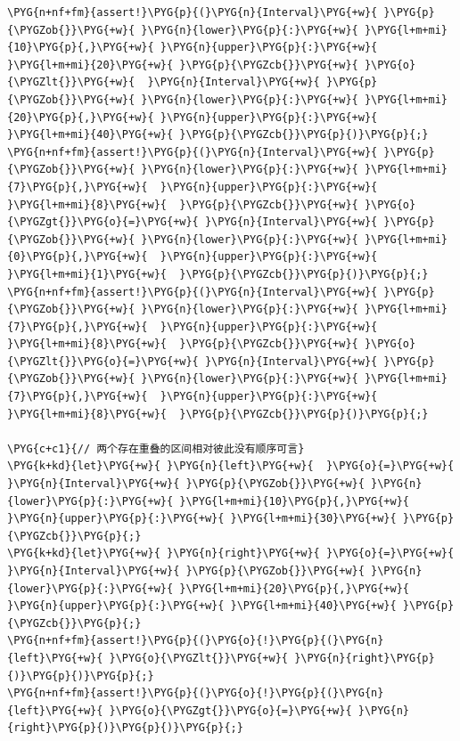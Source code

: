\begin{Verbatim}[commandchars=\\\{\},breaklines=true,breakanywhere=true,fontsize=\codefont,xleftmargin=17bp]
\PYG{n+nf+fm}{assert!}\PYG{p}{(}\PYG{n}{Interval}\PYG{+w}{ }\PYG{p}{\PYGZob{}}\PYG{+w}{ }\PYG{n}{lower}\PYG{p}{:}\PYG{+w}{ }\PYG{l+m+mi}{10}\PYG{p}{,}\PYG{+w}{ }\PYG{n}{upper}\PYG{p}{:}\PYG{+w}{ }\PYG{l+m+mi}{20}\PYG{+w}{ }\PYG{p}{\PYGZcb{}}\PYG{+w}{ }\PYG{o}{\PYGZlt{}}\PYG{+w}{  }\PYG{n}{Interval}\PYG{+w}{ }\PYG{p}{\PYGZob{}}\PYG{+w}{ }\PYG{n}{lower}\PYG{p}{:}\PYG{+w}{ }\PYG{l+m+mi}{20}\PYG{p}{,}\PYG{+w}{ }\PYG{n}{upper}\PYG{p}{:}\PYG{+w}{ }\PYG{l+m+mi}{40}\PYG{+w}{ }\PYG{p}{\PYGZcb{}}\PYG{p}{)}\PYG{p}{;}
\PYG{n+nf+fm}{assert!}\PYG{p}{(}\PYG{n}{Interval}\PYG{+w}{ }\PYG{p}{\PYGZob{}}\PYG{+w}{ }\PYG{n}{lower}\PYG{p}{:}\PYG{+w}{ }\PYG{l+m+mi}{7}\PYG{p}{,}\PYG{+w}{  }\PYG{n}{upper}\PYG{p}{:}\PYG{+w}{ }\PYG{l+m+mi}{8}\PYG{+w}{  }\PYG{p}{\PYGZcb{}}\PYG{+w}{ }\PYG{o}{\PYGZgt{}}\PYG{o}{=}\PYG{+w}{ }\PYG{n}{Interval}\PYG{+w}{ }\PYG{p}{\PYGZob{}}\PYG{+w}{ }\PYG{n}{lower}\PYG{p}{:}\PYG{+w}{ }\PYG{l+m+mi}{0}\PYG{p}{,}\PYG{+w}{  }\PYG{n}{upper}\PYG{p}{:}\PYG{+w}{ }\PYG{l+m+mi}{1}\PYG{+w}{  }\PYG{p}{\PYGZcb{}}\PYG{p}{)}\PYG{p}{;}
\PYG{n+nf+fm}{assert!}\PYG{p}{(}\PYG{n}{Interval}\PYG{+w}{ }\PYG{p}{\PYGZob{}}\PYG{+w}{ }\PYG{n}{lower}\PYG{p}{:}\PYG{+w}{ }\PYG{l+m+mi}{7}\PYG{p}{,}\PYG{+w}{  }\PYG{n}{upper}\PYG{p}{:}\PYG{+w}{ }\PYG{l+m+mi}{8}\PYG{+w}{  }\PYG{p}{\PYGZcb{}}\PYG{+w}{ }\PYG{o}{\PYGZlt{}}\PYG{o}{=}\PYG{+w}{ }\PYG{n}{Interval}\PYG{+w}{ }\PYG{p}{\PYGZob{}}\PYG{+w}{ }\PYG{n}{lower}\PYG{p}{:}\PYG{+w}{ }\PYG{l+m+mi}{7}\PYG{p}{,}\PYG{+w}{  }\PYG{n}{upper}\PYG{p}{:}\PYG{+w}{ }\PYG{l+m+mi}{8}\PYG{+w}{  }\PYG{p}{\PYGZcb{}}\PYG{p}{)}\PYG{p}{;}

\PYG{c+c1}{// 两个存在重叠的区间相对彼此没有顺序可言}
\PYG{k+kd}{let}\PYG{+w}{ }\PYG{n}{left}\PYG{+w}{  }\PYG{o}{=}\PYG{+w}{ }\PYG{n}{Interval}\PYG{+w}{ }\PYG{p}{\PYGZob{}}\PYG{+w}{ }\PYG{n}{lower}\PYG{p}{:}\PYG{+w}{ }\PYG{l+m+mi}{10}\PYG{p}{,}\PYG{+w}{ }\PYG{n}{upper}\PYG{p}{:}\PYG{+w}{ }\PYG{l+m+mi}{30}\PYG{+w}{ }\PYG{p}{\PYGZcb{}}\PYG{p}{;}
\PYG{k+kd}{let}\PYG{+w}{ }\PYG{n}{right}\PYG{+w}{ }\PYG{o}{=}\PYG{+w}{ }\PYG{n}{Interval}\PYG{+w}{ }\PYG{p}{\PYGZob{}}\PYG{+w}{ }\PYG{n}{lower}\PYG{p}{:}\PYG{+w}{ }\PYG{l+m+mi}{20}\PYG{p}{,}\PYG{+w}{ }\PYG{n}{upper}\PYG{p}{:}\PYG{+w}{ }\PYG{l+m+mi}{40}\PYG{+w}{ }\PYG{p}{\PYGZcb{}}\PYG{p}{;}
\PYG{n+nf+fm}{assert!}\PYG{p}{(}\PYG{o}{!}\PYG{p}{(}\PYG{n}{left}\PYG{+w}{ }\PYG{o}{\PYGZlt{}}\PYG{+w}{ }\PYG{n}{right}\PYG{p}{)}\PYG{p}{)}\PYG{p}{;}
\PYG{n+nf+fm}{assert!}\PYG{p}{(}\PYG{o}{!}\PYG{p}{(}\PYG{n}{left}\PYG{+w}{ }\PYG{o}{\PYGZgt{}}\PYG{o}{=}\PYG{+w}{ }\PYG{n}{right}\PYG{p}{)}\PYG{p}{)}\PYG{p}{;}
\end{Verbatim}

